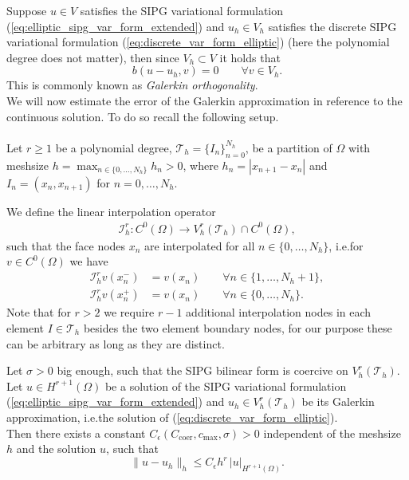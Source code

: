 Suppose $u \in V$ satisfies the SIPG variational formulation (\ref{eq:elliptic_sipg_var_form_extended}) and 
$u_h \in V_h$ satisfies the discrete SIPG variational formulation (\ref{eq:discrete_var_form_elliptic}) (here the polynomial degree does not matter),  
then since $V_h \subset V$ it holds that 
\begin{equation}
	\label{eq:galerkin_orthogonality}
	b(u - u_h, v) = 0 \qquad \forall v \in V_h.
\end{equation}
This is commonly known as \textit{Galerkin orthogonality}. \\
We will now estimate the error of the Galerkin approximation in reference to the continuous solution. To do so recall the following setup. \\ \\
Let $r \geq 1$ be a polynomial degree, $\mathcal{T}_h = \{I_n\}_{n=0}^{N_h}$, be a partition of $\Omega$ with meshsize 
$ h = \max_{n \in \{0,\ldots,N_h\}} h_n > 0$, where $h_n = |x_{n+1} - x_n |$ and $I_n = (x_{n}, x_{n+1})$ for 
$n=0,\ldots,N_h$.
\begin{definition}
	We define the linear interpolation operator 
	\begin{eqnarray*}
		\mathcal{I}_h^r : C^{0}(\Omega) \to V_h^r(\mathcal{T}_h) \cap C^0(\Omega),
	\end{eqnarray*}
	such that the face nodes $x_n$ are interpolated for all $n \in \{0,\ldots,N_h\}$, i.e.\@ for $v \in C^0(\Omega)$ we have
	\begin{align*}
		\mathcal{I}_h^r v (x_n^-) &= v(x_n) \qquad \forall n \in \{1,\ldots,N_h +1 \}, \\
		\mathcal{I}_h^r v (x_n^+) &= v(x_n) \qquad \forall n \in \{0,\ldots,N_h \}.
	\end{align*}
	Note that for $r > 2$ we require $r-1$ additional interpolation nodes in each element $I \in \mathcal{T}_h$ besides the two element boundary nodes, for our purpose these 
	can be arbitrary as long as they are distinct. 
\end{definition}
\begin{theorem}
	\label{thr:elliptic_energy_convergence}
	Let $\sigma > 0$ big enough, such that the SIPG bilinear form is coercive on $V_h^r(\mathcal{T}_h)$.
	Let $u \in H^{r+1}(\Omega)$ be a solution of the SIPG variational formulation (\ref{eq:elliptic_sipg_var_form_extended}) and $u_h \in V_h^r(\mathcal{T}_h)$ be its
	Galerkin approximation, i.e.\@ the solution of (\ref{eq:discrete_var_form_elliptic}). \\
	Then there exists a constant $C_{\epsilon}(C_{\text{coer}}, c_{\max}, \sigma) > 0$ independent of the meshsize $h$ and the solution $u$, such that 
	\begin{equation}
		\label{eq:elliptic_energy_convergence_rate}
		\|u - u_h \|_{h} \leq C_{\epsilon} h^{r} \, |u|_{H^{r+1}(\Omega)}.
	\end{equation}
	
\end{theorem}
